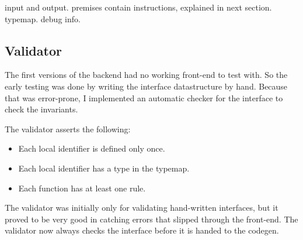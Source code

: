 input and output.
premises contain instructions, explained in next section.
typemap.
debug info.

\subsection{Validator}
The first versions of the backend had no working front-end to test with.
So the early testing was done by writing the interface datastructure by hand.
Because that was error-prone, I implemented an automatic checker for the interface to check the invariants.

The validator asserts the following:
\begin{itemize}
\item Each local identifier is defined only once.
\item Each local identifier has a type in the typemap.
\item Each function has at least one rule.
\end{itemize}

The validator was initially only for validating hand-written interfaces,
but it proved to be very good in catching errors that slipped through the front-end.
The validator now always checks the interface before it is handed to the codegen.

